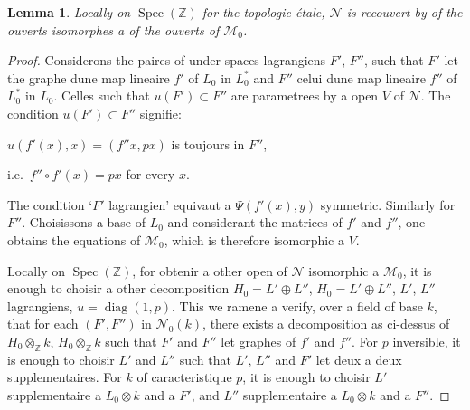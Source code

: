 \documentclass[11pt,a4paper]{article}
\theoremstyle{plain}
\newtheorem{lemma}[theorem]{Lemma}
\theoremstyle{definition}
\DeclareMathOperator{\Spec}{Spec}
\DeclareMathOperator{\diag}{diag}
\begin{document}
\begin{lemma}
Locally on $\Spec(\mathbb{Z})$ for the topologie étale, $\mathscr{N}$ is recouvert
by of the ouverts isomorphes a of the ouverts of $\mathscr{M}_0$.
\end{lemma}

\begin{proof}
Considerons the paires of under-spaces lagrangiens $F'$, $F''$, such that $F'$
let the graphe dune map lineaire $f'$ of $L_0$ in $L_0^*$ and $F''$ celui dune
map lineaire $f''$ of $L_0^*$ in $L_0$. Celles such that $u(F') \subset F''$ are
parametrees by a open $V$ of $\mathscr{N}$. The condition $u(F') \subset F''$ signifie:

$u(f'(x), x) = (f''x, px)$ is toujours in $F''$,

i.e.~$f'' \circ f'(x) = px$ for every $x$.

The condition `$F'$ lagrangien' equivaut a $\Psi(f'(x), y)$ symmetric. Similarly
for $F''$. Choisissons a base of $L_0$ and considerant the matrices of $f'$ and $f''$, one obtains the equations of $\mathscr{M}_0$, which is therefore isomorphic a $V$.

Locally on $\Spec(\mathbb{Z})$, for obtenir a other open of $\mathscr{N}$ isomorphic a
$\mathscr{M}_0$, it is enough to choisir a other decomposition $H_0 = L' \oplus L''$, $H_0 = L' \oplus L''$,
$L'$, $L''$ lagrangiens, $u = \diag(1, p)$. This we ramene a verify, over a field of
base $k$, that for each $(F', F'')$ in $\mathscr{N}_0(k)$, there exists a decomposition
as ci-dessus of $H_0 \otimes_\mathbb{Z} k$, $H_0 \otimes_\mathbb{Z} k$ such that $F'$ and $F''$ let graphes of $f'$ and
$f''$. For $p$ inversible, it is enough to choisir $L'$ and $L''$ such that $L'$, $L''$ and $F'$ let
deux a deux supplementaires. For $k$ of caracteristique $p$, it is enough to choisir $L'$
supplementaire a $L_0 \otimes k$ and a $F'$, and $L''$ supplementaire a $L_0 \otimes k$ and a $F''$.
\end{proof}
\end{document}
